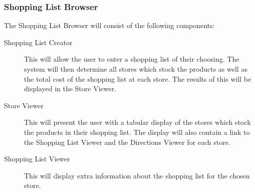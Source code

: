 \subsubsection{Shopping List Browser}

The Shopping List Browser will consist of the following components:

\begin{description}
\item[Shopping List Creator] This will allow the user to enter a shopping list of their choosing. The system will then determine all stores which stock the products as well as the total cost of the shopping list at each store. The results of this will be displayed in the Store Viewer.
\item[Store Viewer] This will present the user with a tabular display of the stores which stock the products in their shopping list. The display will also contain a link to the Shopping List Viewer and the Directions Viewer for each store.
\item[Shopping List Viewer] This will display extra information about the shopping list for the chosen store.
\end{description} 

